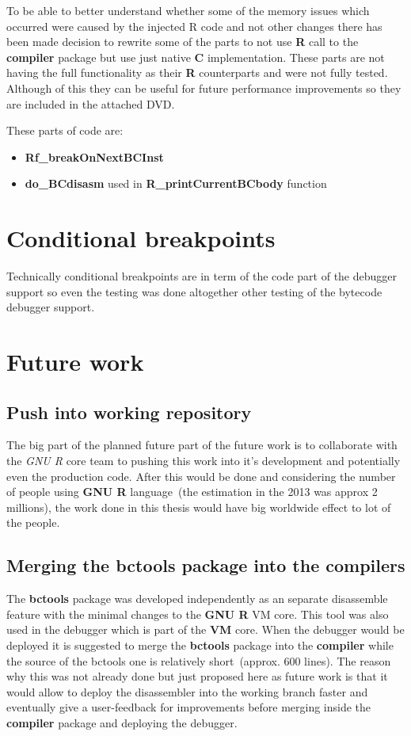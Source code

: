 \documentclass[thesis=M,english]{FITthesis}[2018/10/20]
\begin{document}
To be able to better understand whether some of the memory issues which occurred were caused by the injected R code and not other changes there has been made decision to rewrite some of the parts to not use \textbf{R} call to the \textbf{compiler} package but use just native \textbf{C} implementation. These parts are not having the full functionality as their \textbf{R} counterparts and were not fully tested. Although of this they can be useful for future performance improvements so they are included in the attached DVD.

These parts of code are:
\begin{itemize}
 \item \textbf{Rf{\_}breakOnNextBCInst}
 \item \textbf{do{\_}BCdisasm} used in \textbf{R{\_}printCurrentBCbody} function
\end{itemize}

\section{Conditional breakpoints}

Technically conditional breakpoints are in term of the code part of the debugger support so even the testing was done altogether other testing of the bytecode debugger support.

\section{Future work}

\subsection{Push into working repository}

The big part of the planned future part of the future work is to collaborate with the \textit{GNU R} core team to pushing this work into it's development and potentially even the production code. After this would be done and considering the number of people using \textbf{GNU R} language~(the estimation in the 2013 was approx 2 millions), the work done in this thesis would have big worldwide effect to lot of the people.

\subsection{Merging the bctools package into the compilers}

The \textbf{bctools} package was developed independently as an separate disassemble feature with the minimal changes to the \textbf{GNU R} VM core. This tool was also used in the debugger which is part of the \textbf{VM} core. When the debugger would be deployed it is suggested to merge the \textbf{bctools} package into the \textbf{compiler} while the source of the bctools one is relatively short~(approx. 600 lines). The reason why this was not already done but just proposed here as future work is that it would allow to deploy the disassembler into the working branch faster and eventually give a user-feedback for improvements before merging inside the \textbf{compiler} package and deploying the debugger.
\end{document}
